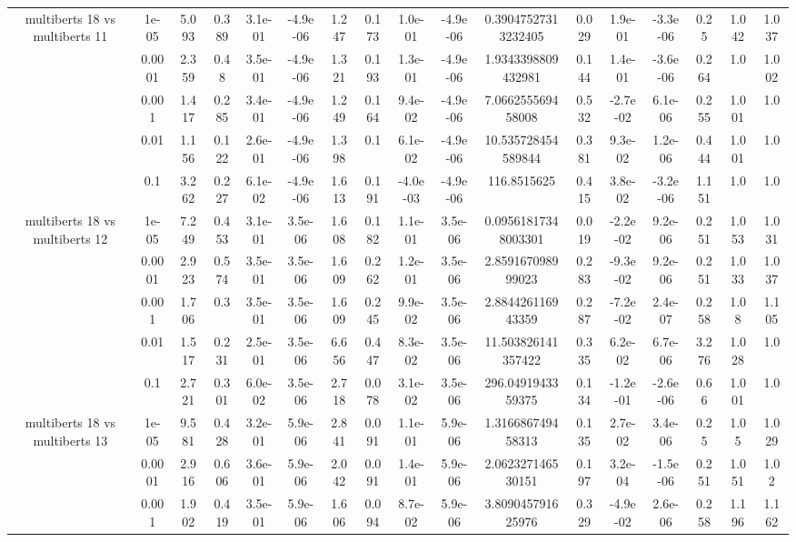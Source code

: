 \begin{tabular}{|c|c|c|c|c|c|c|c|c|c|c|c|c|c|c|c|c|}
\hline
\multirow{5}{*}{multiberts 18 vs multiberts 11} & 1e-05 & 5.093 & 0.389 & 3.1e-01 & -4.9e-06 & 1.247 & 0.173 & 1.0e-01 & -4.9e-06 & 0.39047527313232405 & 0.029 & 1.9e-01 & -3.3e-06 & 0.25 & 1.042 & 1.037 \\
 & 0.0001 & 2.359 & 0.48 & 3.5e-01 & -4.9e-06 & 1.321 & 0.193 & 1.3e-01 & -4.9e-06 & 1.9343398809432981 & 0.144 & 1.4e-01 & -3.6e-06 & 0.264 & 1.0 & 1.002 \\
 & 0.001 & 1.417 & 0.285 & 3.4e-01 & -4.9e-06 & 1.249 & 0.164 & 9.4e-02 & -4.9e-06 & 7.066255569458008 & 0.532 & -2.7e-02 & 6.1e-06 & 0.255 & 1.001 & 1.0 \\
 & 0.01 & 1.156 & 0.122 & 2.6e-01 & -4.9e-06 & 1.398 & 0.1 & 6.1e-02 & -4.9e-06 & 10.535728454589844 & 0.381 & 9.3e-02 & 1.2e-06 & 0.444 & 1.001 & 1.0 \\
 & 0.1 & 3.262 & 0.227 & 6.1e-02 & -4.9e-06 & 1.613 & 0.191 & -4.0e-03 & -4.9e-06 & 116.8515625 & 0.415 & 3.8e-02 & -3.2e-06 & 1.151 & 1.0 & 1.0 \\
\hline
\multirow{5}{*}{multiberts 18 vs multiberts 12} & 1e-05 & 7.249 & 0.453 & 3.1e-01 & 3.5e-06 & 1.608 & 0.182 & 1.1e-01 & 3.5e-06 & 0.09561817348003301 & 0.019 & -2.2e-02 & 9.2e-06 & 0.251 & 1.053 & 1.031 \\
 & 0.0001 & 2.923 & 0.574 & 3.5e-01 & 3.5e-06 & 1.609 & 0.262 & 1.2e-01 & 3.5e-06 & 2.859167098999023 & 0.283 & -9.3e-02 & 9.2e-06 & 0.251 & 1.033 & 1.037 \\
 & 0.001 & 1.706 & 0.3 & 3.5e-01 & 3.5e-06 & 1.609 & 0.245 & 9.9e-02 & 3.5e-06 & 2.884426116943359 & 0.287 & -7.2e-02 & 2.4e-07 & 0.258 & 1.08 & 1.105 \\
 & 0.01 & 1.517 & 0.231 & 2.5e-01 & 3.5e-06 & 6.656 & 0.447 & 8.3e-02 & 3.5e-06 & 11.503826141357422 & 0.335 & 6.2e-02 & 6.7e-06 & 3.276 & 1.028 & 1.0 \\
 & 0.1 & 2.721 & 0.301 & 6.0e-02 & 3.5e-06 & 2.718 & 0.078 & 3.1e-02 & 3.5e-06 & 296.0491943359375 & 0.134 & -1.2e-01 & -2.6e-06 & 0.66 & 1.001 & 1.0 \\
\hline
\multirow{5}{*}{multiberts 18 vs multiberts 13} & 1e-05 & 9.581 & 0.428 & 3.2e-01 & 5.9e-06 & 2.841 & 0.091 & 1.1e-01 & 5.9e-06 & 1.316686749458313 & 0.135 & 2.7e-02 & 3.4e-06 & 0.25 & 1.05 & 1.029 \\
 & 0.0001 & 2.916 & 0.606 & 3.6e-01 & 5.9e-06 & 2.042 & 0.091 & 1.4e-01 & 5.9e-06 & 2.062327146530151 & 0.197 & 3.2e-04 & -1.5e-06 & 0.251 & 1.051 & 1.02 \\
 & 0.001 & 1.902 & 0.419 & 3.5e-01 & 5.9e-06 & 1.606 & 0.094 & 8.7e-02 & 5.9e-06 & 3.809045791625976 & 0.329 & -4.9e-02 & 2.6e-06 & 0.258 & 1.196 & 1.162 \\

\end{tabular}
